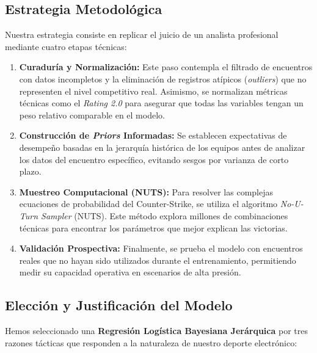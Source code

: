 \documentclass[twocolumn,10pt]{article}
\begin{document}
\subsection{Estrategia Metodológica}
Nuestra estrategia consiste en replicar el juicio de un analista profesional mediante cuatro etapas técnicas:
\begin{enumerate}
    \item \textbf{Curaduría y Normalización:} Este paso contempla el filtrado de encuentros con datos incompletos y la eliminación de registros atípicos (\textit{outliers}) que no representen el nivel competitivo real. Asimismo, se normalizan métricas técnicas como el \textit{Rating 2.0} para asegurar que todas las variables tengan un peso relativo comparable en el modelo.
    \item \textbf{Construcción de \textit{Priors} Informadas:} Se establecen expectativas de desempeño basadas en la jerarquía histórica de los equipos antes de analizar los datos del encuentro específico, evitando sesgos por varianza de corto plazo.
    \item \textbf{Muestreo Computacional (NUTS):} Para resolver las complejas ecuaciones de probabilidad del Counter-Strike, se utiliza el algoritmo \textit{No-U-Turn Sampler} (NUTS). Este método explora millones de combinaciones técnicas para encontrar los parámetros que mejor explican las victorias.
    \item \textbf{Validación Prospectiva:} Finalmente, se prueba el modelo con encuentros reales que no hayan sido utilizados durante el entrenamiento, permitiendo medir su capacidad operativa en escenarios de alta presión.
\end{enumerate}

\subsection{Elección y Justificación del Modelo}
Hemos seleccionado una \textbf{Regresión Logística Bayesiana Jerárquica} por tres razones tácticas que responden a la naturaleza de nuestro deporte electrónico:
\end{document}

